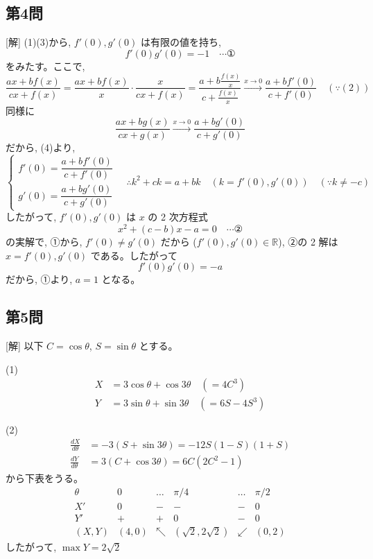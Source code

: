 \documentclass[../main.tex]{subfiles}
\begin{document}
\subsection*{第4問}

[解] (1)(3)から, $f'(0), g'(0)$ は有限の値を持ち,
\[
  f'(0)g'(0) = -1 \quad \cdots \text{①}
\]
をみたす。ここで,
\[
  \frac{ax + b f(x)}{cx + f(x)} = \frac{a x + b f(x)}{x} \cdot \frac{x}{cx + f(x)} = \frac{a + b \frac{f(x)}{x}}{c + \frac{f(x)}{x}} \xrightarrow{x \to 0} \frac{a + b f'(0)}{c + f'(0)} \quad (\because (2))
\]
同様に
\[
  \frac{ax + b g(x)}{cx + g(x)} \xrightarrow{x \to 0} \frac{a + b g'(0)}{c + g'(0)}
\]
だから, (4)より,
\[
  \begin{cases}
    f'(0) = \dfrac{a + b f'(0)}{c + f'(0)} \\[1em]
    g'(0) = \dfrac{a + b g'(0)}{c + g'(0)}
  \end{cases}
  \quad \therefore k^2 + ck = a + bk \quad (k = f'(0), g'(0)) \quad (\because k \neq -c)
\]
したがって, $f'(0), g'(0)$ は $x$ の 2 次方程式
\[
  x^2 + (c-b)x - a = 0 \quad \cdots \text{②}
\]
の実解で, ①から, $f'(0) \neq g'(0)$ だから ($f'(0), g'(0) \in \mathbb{R}$), ②の 2 解は $x = f'(0), g'(0)$ である。したがって
\[
  f'(0)g'(0) = -a
\]
だから, ①より, $a = 1$ となる。

\subsection*{第5問}

[解] 以下 $C = \cos\theta$, $S = \sin\theta$ とする。

(1)
\[
  \begin{aligned}
    X &= 3\cos\theta + \cos 3\theta \quad (= 4C^3) \\
    Y &= 3\sin\theta + \sin 3\theta \quad (= 6S - 4S^3)
  \end{aligned}
\]

(2)
\[
  \begin{aligned}
    \frac{dX}{d\theta} &= -3(S + \sin 3\theta) = -12S(1-S)(1+S) \\
    \frac{dY}{d\theta} &= 3(C + \cos 3\theta) = 6C(2C^2 - 1)
  \end{aligned}
\]
から下表をうる。
\[
  \begin{array}{c|c|c|c|c|c}
    \theta & 0 & \dots & \pi/4 & \dots & \pi/2 \\
    \hline
    X' & 0 & - & - & - & 0 \\
    \hline
    Y' & + & + & 0 & - & 0 \\
    \hline
    (X,Y) & (4,0) & \nwarrow & (\sqrt{2}, 2\sqrt{2}) & \swarrow & (0,2)
  \end{array}
\]
したがって, $\max Y = 2\sqrt{2}$
\end{document}
